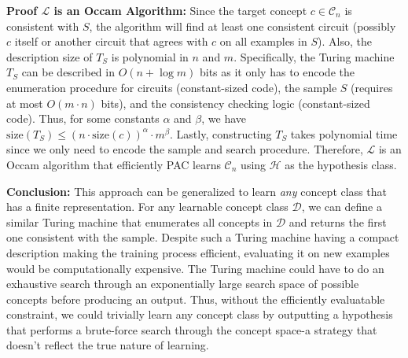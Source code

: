 \documentclass[11pt]{article}
\DeclareMathOperator{\1}{\mathbbm{1}}
\begin{document}
\begin{problem} [10pts]
\textbf{Proof $\mathcal{L}$ is an Occam Algorithm:} Since the target concept $c \in \mathcal{C}_n$ is consistent with $S$, the algorithm will find at least one consistent circuit (possibly $c$ itself or another circuit that agrees with $c$ on all examples in $S$). Also, the description size of $T_S$ is polynomial in $n$ and $m$. Specifically, the Turing machine $T_S$ can be described in $O(n + \log m)$ bits as it only has to encode the enumeration procedure for circuits (constant-sized code), the sample $S$ (requires at most $O(m \cdot n)$ bits), and the consistency checking logic (constant-sized code). Thus, for some constants $\alpha$ and $\beta$, we have $\text{size}(T_S) \leq (n \cdot \text{size}(c))^\alpha \cdot m^\beta$. Lastly, constructing $T_S$ takes polynomial time since we only need to encode the sample and search procedure. Therefore, $\mathcal{L}$ is an Occam algorithm that efficiently PAC learns $\mathcal{C}_n$ using $\mathcal{H}$ as the hypothesis class.

\textbf{Conclusion:} This approach can be generalized to learn \textit{any} concept class that has a finite representation. For any learnable concept class $\mathcal{D}$, we can define a similar Turing machine that enumerates all concepts in $\mathcal{D}$ and returns the first one consistent with the sample. Despite such a Turing machine having a compact description making the training process efficient, evaluating it on new examples would be computationally expensive. The Turing machine could have to do an exhaustive search through an exponentially large search space of possible concepts before producing an output. Thus, without the efficiently evaluatable constraint, we could trivially learn any concept class by outputting a hypothesis that performs a brute-force search through the concept space-a strategy that doesn't reflect the true nature of learning.

\end{problem}
\end{document}
